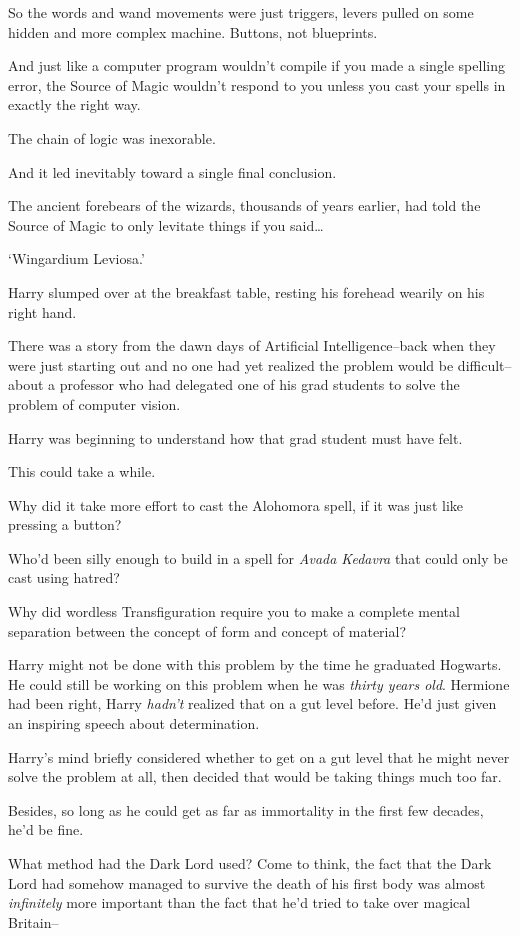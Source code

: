 So the words and wand movements were just triggers, levers pulled on some hidden and more complex machine. Buttons, not blueprints.

And just like a computer program wouldn't compile if you made a single spelling error, the Source of Magic wouldn't respond to you unless you cast your spells in exactly the right way.

The chain of logic was inexorable.

And it led inevitably toward a single final conclusion.

The ancient forebears of the wizards, thousands of years earlier, had told the Source of Magic to only levitate things if you said{\ldots}

`Wingardium Leviosa.'

Harry slumped over at the breakfast table, resting his forehead wearily on his right hand.

There was a story from the dawn days of Artificial Intelligence\---back when they were just starting out and no one had yet realized the problem would be difficult\---about a professor who had delegated one of his grad students to solve the problem of computer vision.

Harry was beginning to understand how that grad student must have felt.

This could take a while.

Why did it take more effort to cast the Alohomora spell, if it was just like pressing a button?

Who'd been silly enough to build in a spell for \emph{Avada Kedavra} that could only be cast using hatred?

Why did wordless Transfiguration require you to make a complete mental separation between the concept of form and concept of material?

Harry might not be done with this problem by the time he graduated Hogwarts. He could still be working on this problem when he was \emph{thirty years old}. Hermione had been right, Harry \emph{hadn't} realized that on a gut level before. He'd just given an inspiring speech about determination.

Harry's mind briefly considered whether to get on a gut level that he might never solve the problem at all, then decided that would be taking things much too far.

Besides, so long as he could get as far as immortality in the first few decades, he'd be fine.

What method had the Dark Lord used? Come to think, the fact that the Dark Lord had somehow managed to survive the death of his first body was almost \emph{infinitely} more important than the fact that he'd tried to take over magical Britain\---

